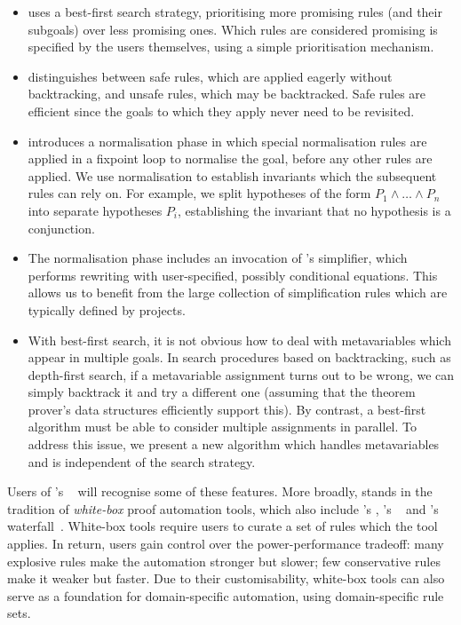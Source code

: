 \begin{itemize}
  \item
    \Aesop{} uses a best-first search strategy, prioritising more promising rules (and their subgoals) over less promising ones.
    Which rules are considered promising is specified by the users themselves, using a simple prioritisation mechanism.
  \item
    \Aesop{} distinguishes between safe rules, which are applied eagerly without backtracking, and unsafe rules, which may be backtracked.
    Safe rules are efficient since the goals to which they apply never need to be revisited.
  \item
    \Aesop{} introduces a normalisation phase in which special normalisation rules are applied in a fixpoint loop to normalise the goal, before any other rules are applied.
    We use normalisation to establish invariants which the subsequent rules can rely on.
    For example, we split hypotheses of the form $P_{1} ∧ \dots ∧ P_{n}$ into separate hypotheses $P_{i}$, establishing the invariant that no hypothesis is a conjunction.
  \item
    The normalisation phase includes an invocation of \Lean's simplifier, which performs rewriting with user-specified, possibly conditional equations.
    This allows us to benefit from the large collection of simplification rules which are typically defined by \Lean{} projects.
  \item
    With best-first search, it is not obvious how to deal with metavariables which appear in multiple goals.
    In search procedures based on backtracking, such as depth-first search, if a metavariable assignment turns out to be wrong, we can simply backtrack it and try a different one (assuming that the theorem prover's data structures efficiently support this).
    By contrast, a best-first algorithm must be able to consider multiple assignments in parallel.
    To address this issue, we present a new algorithm which handles metavariables and is independent of the search strategy.
\end{itemize}

Users of \Isabelle's \auto~\cite{Isabelle,IsabelleAuto} will recognise some of these features.
More broadly, \Aesop{} stands in the tradition of \emph{white-box} proof automation tools, which also include \Coq's , \PVS's \grind~\cite{PVS-tutorial} and \ACLtwo's waterfall~\cite{ACL2}.
White-box tools require users to curate a set of rules which the tool applies.
In return, users gain control over the power-performance tradeoff: many explosive rules make the automation stronger but slower; few conservative rules make it weaker but faster.
Due to their customisability, white-box tools can also serve as a foundation for domain-specific automation, using domain-specific rule sets.

